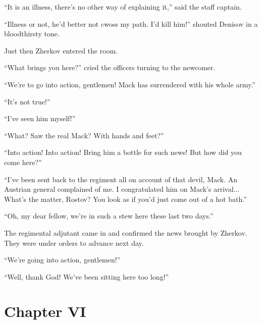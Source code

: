 ``It is an illness, there's no other way of explaining it,'' said
the staff captain.

``Illness or not, he'd better not cwoss my path. I'd kill him!''
shouted Denisov in a bloodthirsty tone.

Just then Zherkov entered the room.

``What brings you here?'' cried the officers turning to the
newcomer.

``We're to go into action, gentlemen! Mack has surrendered with
his whole army.''

``It's not true!''

``I've seen him myself!''

``What? Saw the real Mack? With hands and feet?''

``Into action! Into action! Bring him a bottle for such news! But
how did you come here?''

``I've been sent back to the regiment all on account of that
devil, Mack.  An Austrian general complained of me. I
congratulated him on Mack's arrival... What's the matter, Rostov?
You look as if you'd just come out of a hot bath.''

``Oh, my dear fellow, we're in such a stew here these last two
days.''

The regimental adjutant came in and confirmed the news brought by
Zherkov. They were under orders to advance next day.

``We're going into action, gentlemen!''

``Well, thank God! We've been sitting here too long!''


\chapter*{Chapter VI}

